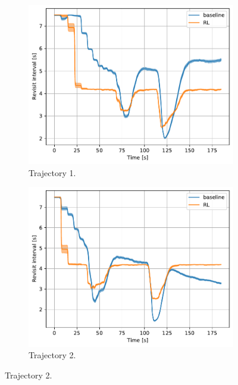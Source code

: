 \documentclass[english, 12pt, a4paper, elec, utf8, a-1b, online]{aaltothesis}
\begin{document}
\begin{figure}[htb]
    \centering
    \begin{subfigure}[b]{0.45\textwidth}
        \centering
        \includegraphics[width=\linewidth]{figures/benchmark/Simulations/revisit_intervals_0.pdf}
        \caption{Trajectory 1.}
        \label{fig:RI_T1}
    \end{subfigure}
    \hfill
    \begin{subfigure}[b]{0.45\textwidth}
        \centering
        \includegraphics[width=\linewidth]{figures/benchmark/Simulations/revisit_intervals_1.pdf}
        \caption{Trajectory 2.}
        \label{fig:RI_T2}
    \end{subfigure}

\end{figure}
\end{document}
